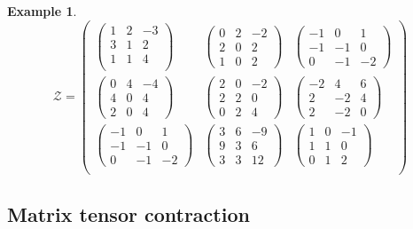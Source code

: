\documentclass[11pt,a4paper,openright,oneside]{book}
\numberwithin{equation}{section}
\newtheorem{example0}[defn0]{Example}
\newenvironment{example}{ \begin{example0}\rm}{\end{example0}}
\begin{document}
\begin{example}
$$\mathcal{Z} = \begin{pmatrix}
\begin{pmatrix}
    1 & 2 & -3 \\
    3 & 1 & 2 \\
    1 & 1 & 4 \\
\end{pmatrix} &
\begin{pmatrix}
    0 & 2 & -2 \\
    2 & 0 & 2 \\
    1 & 0 & 2
\end{pmatrix} &
\begin{pmatrix}
    -1 & 0 & 1 \\
    -1 & -1 & 0 \\
    0 & -1 & -2
\end{pmatrix} \\
\begin{pmatrix}
    0 & 4 & -4 \\
    4 & 0 & 4 \\
    2 & 0 & 4
\end{pmatrix} &
\begin{pmatrix}
    2 & 0 & -2 \\
    2 & 2 & 0 \\
    0 & 2 & 4
\end{pmatrix} &
\begin{pmatrix}
    -2 & 4 & 6 \\
    2 & -2 & 4 \\
    2 & -2 & 0
\end{pmatrix} \\
\begin{pmatrix}
    -1 & 0 & 1 \\
    -1 & -1 & 0 \\
    0 & -1 & -2
\end{pmatrix} &
\begin{pmatrix}
    3 & 6 & -9 \\
    9 & 3 & 6 \\
    3 & 3 & 12
\end{pmatrix} &
\begin{pmatrix}
    1 & 0 & -1 \\
    1 & 1 & 0 \\
    0 & 1 & 2
\end{pmatrix} \\
\end{pmatrix}$$
\label{ex:bigmatrix}
\end{example}

\subsection *{Matrix tensor contraction}
\end{document}
